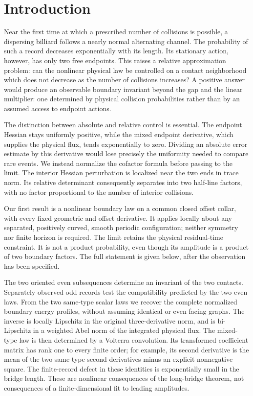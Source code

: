 \section{Introduction}
\label{sec:geometric-results}
Near the first time at which a prescribed number of collisions is possible,
a dispersing billiard follows a nearly normal alternating channel. The
probability of such a record decreases exponentially with its length.
Its stationary action, however, has only two free endpoints. This raises
a relative approximation problem: can the nonlinear physical law be
controlled on a contact neighborhood which does not decrease as the
number of collisions increases? A positive answer would produce an
observable boundary invariant beyond the gap and the linear multiplier:
one determined by physical collision probabilities rather than by an
assumed access to endpoint actions.

The distinction between absolute and relative control is essential.
The endpoint Hessian stays uniformly positive, while the mixed endpoint
derivative, which supplies the physical flux, tends exponentially to
zero. Dividing an absolute error estimate by this derivative would lose
precisely the uniformity needed to compare rare events. We instead
normalize the cofactor formula before passing to the limit. The interior
Hessian perturbation is localized near the two ends in trace norm. Its
relative determinant consequently separates into two half-line factors,
with no factor proportional to the number of interior collisions.

Our first result is a nonlinear boundary law on a common closed offset
collar, with every fixed geometric and offset derivative. It applies
locally about any separated, positively curved, smooth periodic
configuration; neither symmetry nor finite horizon is required. The
limit retains the physical residual-time constraint. It is not a product
probability, even though its amplitude is a product of two boundary
factors. The full statement is given below, after the observation has
been specified.

The two oriented even subsequences determine an invariant of the two
contacts. Separately observed odd records test the compatibility
predicted by the two even laws. From the two same-type scalar laws we recover the complete
normalized boundary energy profiles, without assuming identical or
even facing graphs. The inverse is locally Lipschitz in the original three-derivative
norm, and is bi-Lipschitz in a weighted Abel norm of the integrated
physical flux. The mixed-type law is then determined
by a Volterra convolution. Its transformed coefficient matrix has
rank one to every finite order; for example, its second derivative
is the mean of the two same-type second derivatives minus an explicit
nonnegative square. The finite-record defect in these identities is
exponentially small in the bridge length. These are nonlinear
consequences of the long-bridge theorem, not consequences of a
finite-dimensional fit to leading amplitudes.


